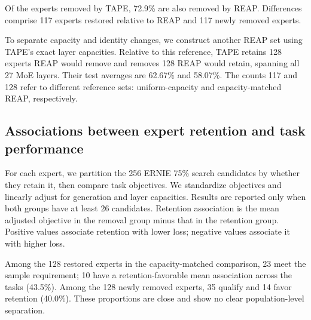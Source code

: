 \documentclass{article}
\begin{document}
Of the experts removed by TAPE, 72.9\% are also removed by REAP. Differences comprise 117 experts restored relative to REAP and 117 newly removed experts.

To separate capacity and identity changes, we construct another REAP set using TAPE's exact layer capacities. Relative to this reference, TAPE retains 128 experts REAP would remove and removes 128 REAP would retain, spanning all 27 MoE layers. Their test averages are 62.67\% and 58.07\%. The counts 117 and 128 refer to different reference sets: uniform-capacity and capacity-matched REAP, respectively.

\subsection{Associations between expert retention and task performance}
\label{sec:6.2}
For each expert, we partition the 256 ERNIE 75\% search candidates by whether they retain it, then compare task objectives. We standardize objectives and linearly adjust for generation and layer capacities. Results are reported only when both groups have at least 26 candidates. Retention association is the mean adjusted objective in the removal group minus that in the retention group. Positive values associate retention with lower loss; negative values associate it with higher loss.

Among the 128 restored experts in the capacity-matched comparison, 23 meet the sample requirement; 10 have a retention-favorable mean association across the tasks (43.5\%). Among the 128 newly removed experts, 35 qualify and 14 favor retention (40.0\%). These proportions are close and show no clear population-level separation.
\end{document}
